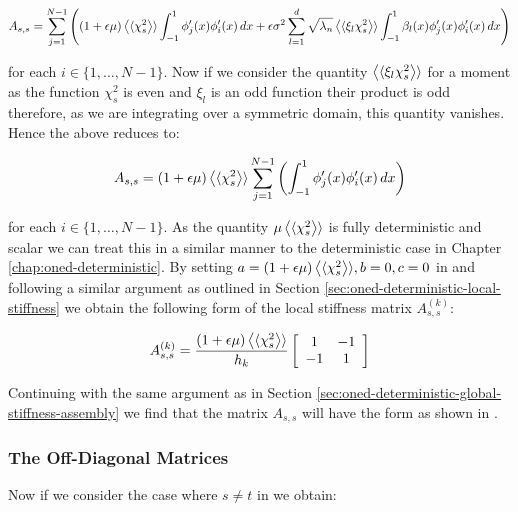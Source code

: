 \begin{equation}
    A_{s,s} = \sum_{j=1}^{N-1}\left((1 + \epsilon\mu)\left\langle\langle\chi_s^2\right\rangle\rangle
        \int_{-1}^1 \phi_j'(x)\phi_i'(x)\, dx
       + \epsilon\sigma^2\sum_{l=1}^d\sqrt{\lambda_n}\left\langle\langle\xi_l\chi_s^2\right\rangle\rangle
       \int_{-1}^1 \beta_l(x)\phi_j'(x)\phi_i'(x) \, dx\right)
\end{equation}

for each $i \in \{1,\ldots,N-1\}$. Now if we consider the quantity
$\left\langle\langle\xi_l\chi_s^2\right\rangle\rangle$ for a moment as the function $\chi_s^2$ is even and
$\xi_l$ is an odd function their product is odd therefore, as we are integrating
over a symmetric domain, this quantity vanishes. Hence the above reduces to:

\begin{equation}
    A_{s,s} = (1 + \epsilon\mu)\left\langle\langle\chi_s^2\right\rangle\rangle\sum_{j=1}^{N - 1}\left(\int_{-1}^1
                \phi_j'(x)\phi_i'(x)\, dx\right)
\end{equation}

for each $i \in \{1,\ldots,N-1\}$. As the quantity $\mu\left\langle\langle\chi_s^2\right\rangle\rangle$ is
fully deterministic and scalar we can treat this in a similar manner to the
deterministic case in  Chapter \ref{chap:oned-deterministic}. By setting $a =
(1 +\epsilon\mu)\left\langle\langle\chi_s^2\right\rangle\rangle, b = 0, c = 0$ in
 and following a similar argument as
outlined in Section \ref{sec:oned-deterministic-local-stiffness} we obtain the
following form of the local stiffness matrix $A_{s,s}^{(k)}$:

\begin{equation}\label{eq:oned-stochasic-local-stifness-diag}
    A_{s,s}^{(k)} = \frac{(1 + \epsilon\mu)\left\langle\langle\chi_s^2\right\rangle\rangle}{h_k}
              \left[\begin{array}{c c}
                1 & -1 \\ -1 & 1
              \end{array}\right]
\end{equation}

Continuing with the same argument as in Section
\ref{sec:oned-deterministic-global-stiffness-assembly} we find that the matrix
$A_{s,s}$ will have the form as shown in
.

\subsubsection{The Off-Diagonal Matrices}

Now if we consider the case where $s \neq t$ in
 we obtain:

